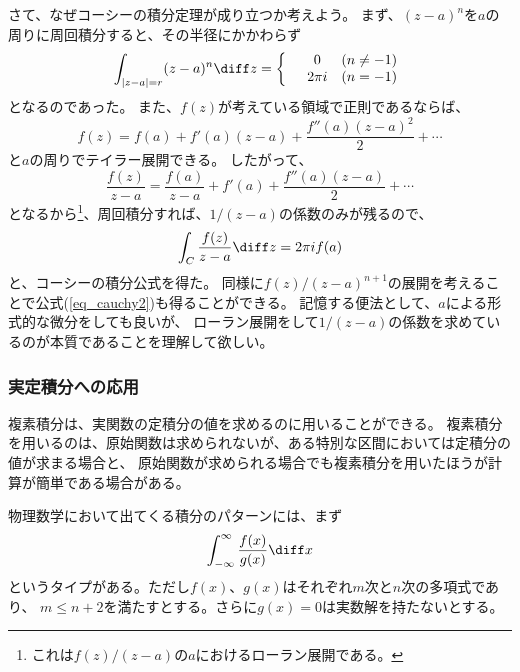 さて、なぜコーシーの積分定理が成り立つか考えよう。
まず、$(z-a)^n$を$a$の周りに周回積分すると、その半径にかかわらず
\begin{eqnarray}
  \int_{|z-a|=r} (z-a)^n \diff z=
  \left\{
  \begin{array}{ccc}
     & 0      & (n \neq -1) \\
     & 2\pi i & (n = -1)
  \end{array}
  \right.
\end{eqnarray}
となるのであった。
また、$f(z)$が考えている領域で正則であるならば、
\begin{equation}
  f(z) = f(a) + f'(a) (z-a) + \frac{f''(a)(z-a)^2}{2} + \cdots
\end{equation}
と$a$の周りでテイラー展開できる。
したがって、
\begin{equation}
  \frac{f(z)}{z-a} = \frac{f(a)}{z-a} + f'(a) + \frac{f''(a)(z-a)}{2} + \cdots
\end{equation}
となるから\footnote{%
  これは$f(z)/(z-a)$の$a$におけるローラン展開である。
}、周回積分すれば、$1/(z-a)$の係数のみが残るので、
\begin{equation}
  \int_C \frac{f(z)}{z-a} \diff z = 2\pi i f(a)
\end{equation}
と、コーシーの積分公式を得た。
同様に$f(z)/(z-a)^{n+1}$の展開を考えることで公式(\ref{eq_cauchy2})も得ることができる。
記憶する便法として、$a$による形式的な微分をしても良いが、
ローラン展開をして$1/(z-a)$の係数を求めているのが本質であることを理解して欲しい。

\subsubsection{実定積分への応用}

複素積分は、実関数の定積分の値を求めるのに用いることができる。
複素積分を用いるのは、原始関数は求められないが、ある特別な区間においては定積分の値が求まる場合と、
原始関数が求められる場合でも複素積分を用いたほうが計算が簡単である場合がある。

物理数学において出てくる積分のパターンには、まず
\begin{equation}
  \int_{-\infty}^{\infty} \frac{f(x)}{g(x)} \diff x
\end{equation}
というタイプがある。ただし$f(x)$、$g(x)$はそれぞれ$m$次と$n$次の多項式であり、
$m\le n + 2$を満たすとする。さらに$g(x)=0$は実数解を持たないとする。

